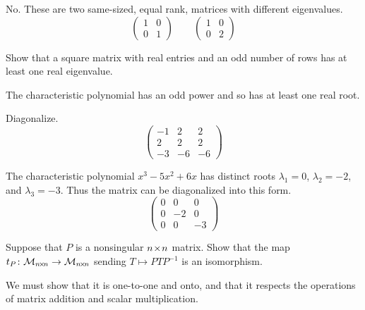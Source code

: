 \begin{exercises}
    \begin{answer}
      No.
      These are two same-sized, equal rank, matrices
      with different eigenvalues.
      \begin{equation*}
        \begin{pmatrix}
          1  &0  \\
          0  &1
        \end{pmatrix}
        \qquad
        \begin{pmatrix}
          1  &0  \\
          0  &2
        \end{pmatrix}
      \end{equation*}
    \end{answer}
  \item 
    Show that a square matrix with real entries and an odd number of rows
    has at least one real eigenvalue.
    \begin{answer}
      The characteristic polynomial has an odd power and so 
      has at least one real root.  
    \end{answer}
  \item 
    Diagonalize.
    \begin{equation*}
       \begin{pmatrix}
         -1  &2  &2  \\
          2  &2  &2  \\
         -3  &-6 &-6
       \end{pmatrix}
    \end{equation*}
    \begin{answer}
      The characteristic polynomial $x^3-5x^2+6x$ has distinct roots
      \( \lambda_1=0 \), \( \lambda_2=-2 \), and \( \lambda_3=-3 \).
      Thus the matrix can be diagonalized into this form.
      \begin{equation*}
         \begin{pmatrix}
            0  &0  &0  \\
            0  &-2 &0  \\
            0  &0  &-3
         \end{pmatrix}
      \end{equation*}    
    \end{answer}
  \item 
    Suppose that \( P \) is a nonsingular \( n \! \times \! n \) matrix.
    Show that 
    the 
    map \( \mbox{$t_P\colon \mathcal{M}_{n \! \times \! n}\to \mathcal{M}_{n \! \times \! n}$} \)
    sending \( T\mapsto PTP^{-1} \)
    is an isomorphism.
    \begin{answer}
      We must show that it is one-to-one and onto, and that it respects the
      operations of matrix addition and scalar multiplication.


\end{answer}
\end{exercises}

